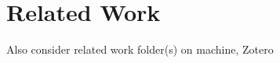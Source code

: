 \chapter{Related Work}\label{chapter:relatedwork}








Also consider related work folder(s) on machine, Zotero

